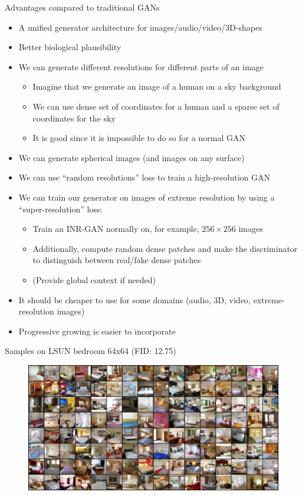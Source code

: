 \documentclass[10pt, handout]{beamer}
\begin{document}
\begin{frame}{Advantages compared to traditional GANs}
\begin{itemize}
    \pause\item A unified generator architecture for images/audio/video/3D-shapes
    \pause\item Better biological plausibility
    \pause\item We can generate different resolutions for different parts of an image
    \begin{itemize}
        \pause\item Imagine that we generate an image of a human on a sky background
        \pause\item We can use dense set of coordinates for a human and a sparse set of coordinates for the sky
        \pause\item It is good since it is impossible to do so for a normal GAN
    \end{itemize}
    \pause\item We can generate spherical images (and images on any surface)
    \pause\item We can use ``random resolutions'' loss to train a high-resolution GAN
    \pause\item We can train our generator on images of extreme resolution by using a ``super-resolution'' loss:
    \begin{itemize}
        \pause\item Train an INR-GAN normally on, for example, $256\times256$ images
        \pause\item Additionally, compute random dense patches and make the discriminator to distinguish between real/fake dense patches
        \pause\item (Provide global context if needed)
    \end{itemize}
    \item\pause It should be cheaper to use for some domains (audio, 3D, video, extreme-resolution images)
    \item\pause Progressive growing is easier to incorporate
\end{itemize}
\end{frame}


\begin{frame}{Samples on LSUN bedroom 64x64 (FID: 12.75)}
\begin{figure}
    \centering
    \includegraphics[width=\textwidth]{images/samples}
\end{figure}
\end{frame}
\end{document}

